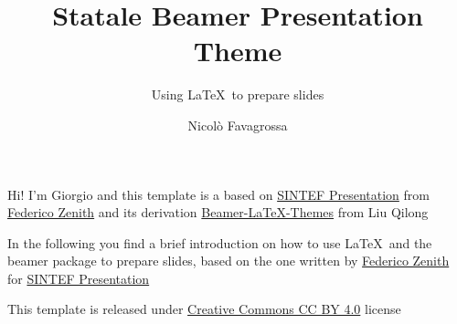 \documentclass{beamer}
\title{Statale Beamer Presentation Theme}
\subtitle{Using \LaTeX\ to prepare slides}
\author{Nicolò Favagrossa}
\newcommand{\hrefcol}[2]{\textcolor{cyan}{\href{#1}{#2}}}
\begin{document}
\maketitle

\begin{frame}

Hi! I'm Giorgio and this template is a based on \hrefcol{https://www.overleaf.com/latex/templates/sintef-presentation/jhbhdffczpnx}{SINTEF Presentation} from \hrefcol{mailto:federico.zenith@sintef.no}{Federico Zenith} and its derivation \hrefcol{https://github.com/TOB-KNPOB/Beamer-LaTeX-Themes}{Beamer-LaTeX-Themes} from Liu Qilong

\vspace{\baselineskip}

In the following you find a brief introduction on how to use \LaTeX\ and the beamer package to prepare slides, based on the one written by \hrefcol{mailto:federico.zenith@sintef.no}{Federico Zenith} for \hrefcol{https://www.overleaf.com/latex/templates/sintef-presentation/jhbhdffczpnx}{SINTEF Presentation}

This template is released under \hrefcol{https://creativecommons.org/licenses/by-nc/4.0/legalcode}{Creative Commons CC BY 4.0} license

\end{frame}











\backmatter
\end{document}
